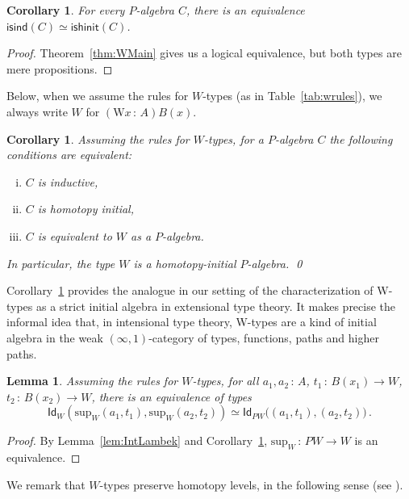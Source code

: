 \documentclass[10pt,a4paper,oneside,reqno]{amsart}
\numberwithin{equation}{section}
\theoremstyle{mythm}
\newtheorem{lemma}[theorem]{Lemma}
\newtheorem{corollary}[theorem]{Corollary}
\theoremstyle{mydef}
\theoremstyle{myrmk}
\newcommand{\co}{\,{:}\,}
\newcommand{\isalgind}{\mathsf{isind}}
\newcommand{\isalghinit}{\mathsf{ishinit}}
\newcommand{\Id}{\mathsf{Id}}
\newcommand{\W}{\mathrm{W}}
\renewcommand{\sup}{\mathrm{sup}}
\begin{document}
\begin{corollary} For every $P$-algebra $C$, there is an equivalence $\isalgind(C) \simeq \isalghinit(C)$.
\end{corollary}

\begin{proof} Theorem~\ref{thm:WMain} gives us a logical equivalence, but both types are mere propositions.
\end{proof} 

Below, when we assume the rules for $W$-types (as in Table~\ref{tab:wrules}), we always write $W$ for $(\W x \co A) B(x)$.

\begin{corollary}
\label{lem:WInitInt} Assuming the rules for $W$-types, for a $P$-algebra
$C$ the following conditions are
equivalent:
\begin{enumerate}[(i)]
\item $C$ is inductive,
\item $C$ is homotopy initial,
\item $C$ is equivalent to $W$ as a $P$-algebra.
\end{enumerate}
In particular, the type $W$ is a homotopy-initial $P$-algebra. \qed
\end{corollary}


Corollary~\ref{lem:WInitInt} provides the analogue in our setting of the characterization of W-types as a strict initial algebra in extensional type theory. It makes precise the informal idea that, in intensional type theory, W-types are a kind of initial algebra in the weak $(\infty, 1)$-category of types, functions, paths and higher paths.  

\begin{lemma} \label{lem:suppath}
Assuming the rules for $W$-types, 
for all $a_1,a_2 \co A$, $t_1 \co B(x_1) \to W$, $t_2 \co B(x_2) \to W$, there is an equivalence of types
\[ 
\Id_W( \sup_W(a_1,t_1),  \sup_W(a_2,t_2)  ) \simeq  \Id_{PW} \big( (a_1,t_1), (a_2,t_2) \big) \, . 
\]
\end{lemma}

\begin{proof}
By Lemma~\ref{lem:IntLambek} and Corollary~\ref{lem:WInitInt}, $\sup_W \co PW \to W$ is an equivalence.
\end{proof}





We  remark that $W$-types  preserve homotopy levels, in the following sense (see \cite{Danielsson:Wtypes}).
\end{document}
